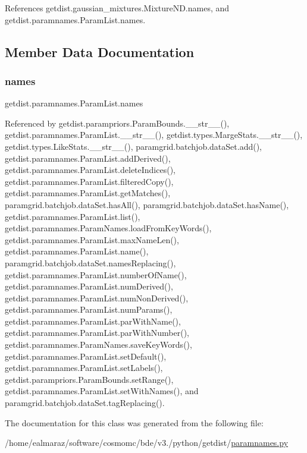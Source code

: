 References getdist.\+gaussian\+\_\+mixtures.\+Mixture\+N\+D.\+names, and getdist.\+paramnames.\+Param\+List.\+names.



\subsection{Member Data Documentation}
\mbox{\label{classgetdist_1_1paramnames_1_1ParamList_a9213bdfb6fb036e21d6adb49a91c2b66}} 
\subsubsection{\texorpdfstring{names}{names}}
{\footnotesize\ttfamily getdist.\+paramnames.\+Param\+List.\+names}



Referenced by getdist.\+parampriors.\+Param\+Bounds.\+\_\+\+\_\+str\+\_\+\+\_\+(), getdist.\+paramnames.\+Param\+List.\+\_\+\+\_\+str\+\_\+\+\_\+(), getdist.\+types.\+Marge\+Stats.\+\_\+\+\_\+str\+\_\+\+\_\+(), getdist.\+types.\+Like\+Stats.\+\_\+\+\_\+str\+\_\+\+\_\+(), paramgrid.\+batchjob.\+data\+Set.\+add(), getdist.\+paramnames.\+Param\+List.\+add\+Derived(), getdist.\+paramnames.\+Param\+List.\+delete\+Indices(), getdist.\+paramnames.\+Param\+List.\+filtered\+Copy(), getdist.\+paramnames.\+Param\+List.\+get\+Matches(), paramgrid.\+batchjob.\+data\+Set.\+has\+All(), paramgrid.\+batchjob.\+data\+Set.\+has\+Name(), getdist.\+paramnames.\+Param\+List.\+list(), getdist.\+paramnames.\+Param\+Names.\+load\+From\+Key\+Words(), getdist.\+paramnames.\+Param\+List.\+max\+Name\+Len(), getdist.\+paramnames.\+Param\+List.\+name(), paramgrid.\+batchjob.\+data\+Set.\+names\+Replacing(), getdist.\+paramnames.\+Param\+List.\+number\+Of\+Name(), getdist.\+paramnames.\+Param\+List.\+num\+Derived(), getdist.\+paramnames.\+Param\+List.\+num\+Non\+Derived(), getdist.\+paramnames.\+Param\+List.\+num\+Params(), getdist.\+paramnames.\+Param\+List.\+par\+With\+Name(), getdist.\+paramnames.\+Param\+List.\+par\+With\+Number(), getdist.\+paramnames.\+Param\+Names.\+save\+Key\+Words(), getdist.\+paramnames.\+Param\+List.\+set\+Default(), getdist.\+paramnames.\+Param\+List.\+set\+Labels(), getdist.\+parampriors.\+Param\+Bounds.\+set\+Range(), getdist.\+paramnames.\+Param\+List.\+set\+With\+Names(), and paramgrid.\+batchjob.\+data\+Set.\+tag\+Replacing().



The documentation for this class was generated from the following file\+:\begin{DoxyCompactItemize}
\item 
/home/ealmaraz/software/cosmomc/bde/v3./python/getdist/\mbox{\hyperlink{paramnames_8py}{paramnames.\+py}}\end{DoxyCompactItemize}
